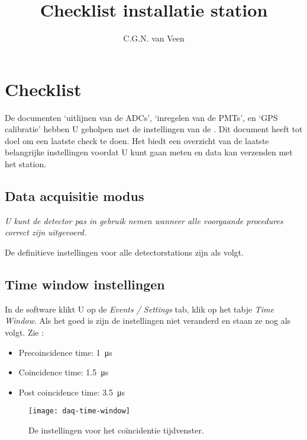 

\title{Checklist installatie station}
\author{C.G.N. van Veen}



\maketitle

\section{Checklist}
De documenten `uitlijnen van de ADCs', `inregelen van de PMTs', en
`GPS calibratie' hebben U geholpen met de instellingen van de \hisparc
\daq. Dit document heeft tot doel om een laatste check te doen. Het
biedt een overzicht van de laatste belangrijke instellingen voordat U kunt gaan
meten en data kan verzenden met het \hisparc station.

\subsection{Data acquisitie modus}

\emph{U kunt de detector pas in gebruik nemen wanneer alle voorgaande procedures correct zijn uitgevoerd.}

De definitieve instellingen voor alle \hisparc detectorstations zijn als volgt.

\subsection{Time window instellingen}

In de \daq software klikt U op de \emph{Events / Settings} tab, klik op het
tabje \emph{Time Window}. Als het goed is zijn de instellingen niet veranderd
en staan ze nog als volgt. Zie :

\begin{itemize}
    \item Precoincidence time: \SI{1}{\micro\second}
    \item Coincidence time: \SI{1.5}{\micro\second}
    \item Post coincidence time: \SI{3.5}{\micro\second}
\end{itemize}

\begin{figure}
    \centering
    \texttt{[image: daq-time-window]}
    \caption{De instellingen voor het coïncidentie tijdvenster.}
    \label{fig:daq-time-window}
\end{figure}


